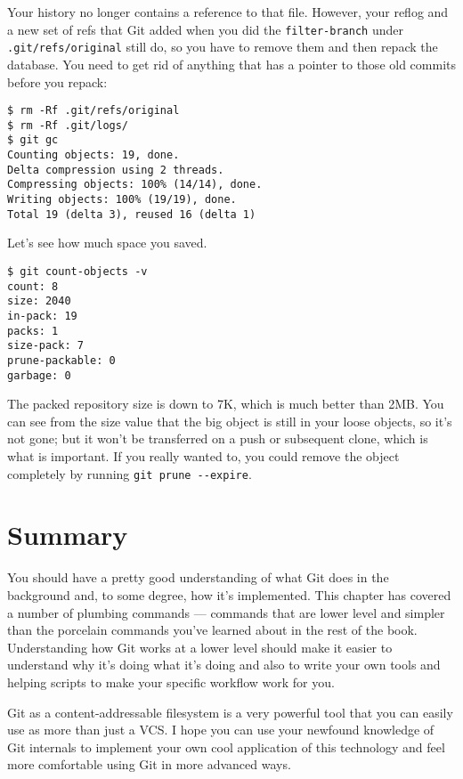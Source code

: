 \documentclass[a4paper]{book}
\newcounter{tab}[chapter]
\begin{document}
Your history no longer contains a reference to that file. However, your reflog and a new set of refs that Git added when you did the \texttt{filter-branch} under \texttt{.git/refs/original} still do, so you have to remove them and then repack the database. You need to get rid of anything that has a pointer to those old commits before you repack:

\begin{shaded}\begin{verbatim}
$ rm -Rf .git/refs/original
$ rm -Rf .git/logs/
$ git gc
Counting objects: 19, done.
Delta compression using 2 threads.
Compressing objects: 100% (14/14), done.
Writing objects: 100% (19/19), done.
Total 19 (delta 3), reused 16 (delta 1)
\end{verbatim}\end{shaded}

Let's see how much space you saved.

\begin{shaded}\begin{verbatim}
$ git count-objects -v
count: 8
size: 2040
in-pack: 19
packs: 1
size-pack: 7
prune-packable: 0
garbage: 0
\end{verbatim}\end{shaded}

The packed repository size is down to 7K, which is much better than 2MB. You can see from the size value that the big object is still in your loose objects, so it's not gone; but it won't be transferred on a push or subsequent clone, which is what is important. If you really wanted to, you could remove the object completely by running \texttt{git prune -{}-expire}.

\section{Summary}

You should have a pretty good understanding of what Git does in the background and, to some degree, how it's implemented. This chapter has covered a number of plumbing commands --- commands that are lower level and simpler than the porcelain commands you've learned about in the rest of the book. Understanding how Git works at a lower level should make it easier to understand why it's doing what it's doing and also to write your own tools and helping scripts to make your specific workflow work for you.

Git as a content-addressable filesystem is a very powerful tool that you can easily use as more than just a VCS. I hope you can use your newfound knowledge of Git internals to implement your own cool application of this technology and feel more comfortable using Git in more advanced ways.
\end{document}
